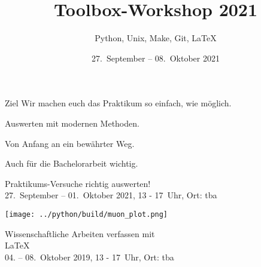

\title[Toolbox 2021]{Toolbox-Workshop 2021}
\subtitle{Python, Unix, Make, Git, \LaTeX{}}
\date{27.~September – 08.~Oktober 2021}
\author[Toolbox-Team]{}



\maketitle

\begin{frame}{Ziel}
  \setlength\parskip{3ex}
  \huge
  Wir machen euch das Praktikum so einfach, wie möglich.

  Auswerten mit modernen Methoden.

  Von Anfang an ein bewährter Weg.

  Auch für die Bachelorarbeit wichtig.
\end{frame}

\begin{frame}
  \vspace{2cm}
  \begin{center}
    \huge Praktikums-Versuche richtig auswerten!\\
    27.~September – 01.~Oktober 2021, 13 - 17~Uhr, Ort: tba
  \end{center}
\end{frame}

\begin{frame}[plain]
  \texttt{[image: ../python/build/muon\_plot.png]}
\end{frame}

\begin{frame}
  \begin{center}
    \huge Wissenschaftliche Arbeiten verfassen mit \\[0.5\baselineskip]
    \textrm{\fontsize{80}{120}\selectfont\LaTeX{}}\\[0.5\baselineskip]
    04. – 08.~Oktober 2019, 13 - 17~Uhr, Ort: tba
  \end{center}
\end{frame}

